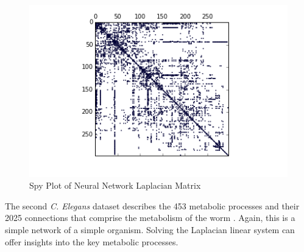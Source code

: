 \documentclass{article}
\begin{document}
\begin{figure}
\centering
\includegraphics[width = \linewidth]{neuralspy.png}
\caption{Spy Plot of Neural Network Laplacian Matrix}
\end{figure}

The second \textit{C. Elegans} dataset describes the 453 metabolic processes and their 2025 connections that comprise the metabolism of the worm \cite{Duch:2005}. Again, this is a simple network of a simple organism. Solving the Laplacian linear system can offer insights into the key metabolic processes.
\end{document}
